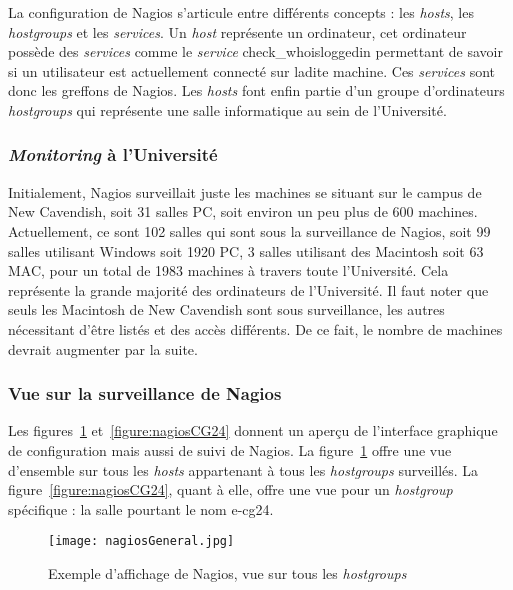 La configuration de Nagios s'articule entre diff\'erents concepts : les \textit{hosts}, les \textit{hostgroups} et les \textit{services}.
Un \textit{host} repr\'esente un ordinateur, cet ordinateur poss\`ede des \textit{services} comme le \textit{service} \textsf{check\_whoisloggedin} permettant de savoir si un utilisateur est actuellement connect\'e sur ladite machine. 
Ces \textit{services} sont donc les greffons de Nagios.
Les \textit{hosts} font enfin partie d'un groupe d'ordinateurs \textit{hostgroups} qui repr\'esente une salle informatique au sein de l'Universit\'e.

\subsubsection{\og{}\textit{Monitoring}\fg{} \`a l'Universit\'e}

Initialement, Nagios surveillait juste les machines se situant sur le campus de New Cavendish, soit 31 salles PC, soit environ un peu plus de 600 machines.
Actuellement, ce sont 102 salles qui sont sous la surveillance de Nagios, soit 99 salles utilisant Windows soit 1920 PC, 3 salles utilisant des Macintosh soit 63 MAC, pour un total de 1983 machines \`a travers toute l'Universit\'e. Cela repr\'esente la grande majorit\'e des ordinateurs de l'Universit\'e.
Il faut noter que seuls les Macintosh de New Cavendish sont sous surveillance, les autres n\'ecessitant d'\^etre list\'es et des acc\`es diff\'erents.
De ce fait, le nombre de machines devrait augmenter par la suite.

\subsubsection{Vue sur la surveillance de Nagios}

Les figures~\ref{figure:nagiosGeneral} et~\ref{figure:nagiosCG24}  donnent un aper\c{c}u de l'interface graphique de configuration mais aussi de suivi de Nagios.
La figure~\ref{figure:nagiosGeneral} offre une vue d'ensemble sur tous les \textit{hosts} appartenant \`a tous les \textit{hostgroups} surveill\'es.
La figure~\ref{figure:nagiosCG24}, quant \`a elle, offre une vue pour un \textit{hostgroup} sp\'ecifique : la salle pourtant le nom \textsf{e-cg24}.

\clearpage

\begin{figure}[!ht]
	\centering
	\texttt{[image: nagiosGeneral.jpg]}
	\caption{Exemple d'affichage de Nagios, vue sur tous les \textit{hostgroups}}
	\label{figure:nagiosGeneral}
	
\end{figure}

